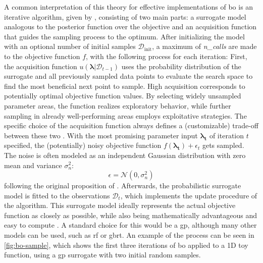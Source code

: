 A common interpretation of this theory for effective implementations of \gls{bo} is an iterative algorithm, given by , consisting of two main parts: a surrogate model analogous to the posterior function over the objective and an acquisition function that guides the sampling process to the optimum. After initializing the model with an optional number of initial samples $\mathcal{D}_\text{init}$, a maximum of \textit{n\_calls} are made to the objective function $f$, with the following process for each iteration: 
First, the acquisition function $u(\mathbf{\lambda}|\mathcal{D}_{t-1})$ uses the probability distribution of the surrogate and all previously sampled data points to evaluate the search space to find the most beneficial next point to sample. High acquisition corresponds to potentially optimal objective function values. By selecting widely unsampled parameter areas, the function realizes exploratory behavior, while further sampling in already well-performing areas employs exploitative strategies. The specific choice of the acquisition function always defines a (customizable) trade-off between these two \cite{brochu2010tutorial}. 
With the most promising parameter input $\mathbf{\lambda_t}$ of iteration $t$ specified, the (potentially) noisy objective function $f(\mathbf{\lambda_t}) + \epsilon_t$ gets sampled. The noise is often modeled as an independent Gaussian distribution with zero mean and variance $\sigma_n^2$:
\begin{equation}
	\label{eq:gauss-noies}
	\epsilon = \mathcal{N}(0,\sigma_n^2)
\end{equation} 
following the original proposition of \citet{williams2006gaussian}.
Afterwards, the probabilistic surrogate model is fitted to the observations $\mathcal{D}_t$, which implements the update procedure of the algorithm. This surrogate model ideally represents the actual objective function as closely as possible, while also being mathematically advantageous and easy to compute \cite{feurer2019hyperparameter}. A standard choice for this would be a \gls{gp}, although many other models can be used, such as \gls{rf} or \gls{gbrt}.
An example of the process can be seen in \cref{fig:bo-sample}, which shows the first three iterations of \gls{bo} applied to a 1D toy function, using a \gls{gp} surrogate with two initial random samples.

